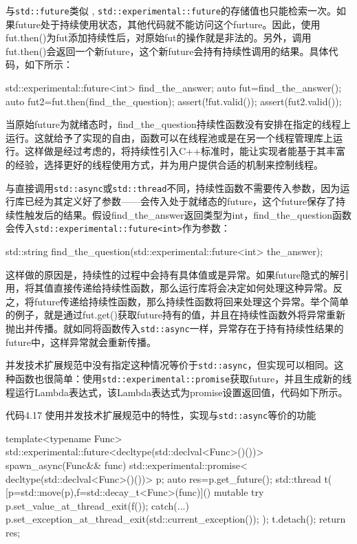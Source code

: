 与\texttt{std::future}类似 ,  \texttt{std::experimental::future}的存储值也只能检索一次。如果future处于持续使用状态，其他代码就不能访问这个furture。因此，使用fut.then()为fut添加持续性后，对原始fut的操作就是非法的。另外，调用fut.then()会返回一个新future，这个新future会持有持续性调用的结果。具体代码，如下所示：

\begin{cpp}
std::experimental::future<int> find_the_answer;
auto fut=find_the_answer();
auto fut2=fut.then(find_the_question);
assert(!fut.valid());
assert(fut2.valid());
\end{cpp}

当原始future为就绪态时，find\_the\_question持续性函数没有安排在指定的线程上运行。这就给予了实现的自由，函数可以在线程池或是在另一个线程管理库上运行。这样做是经过考虑的，将持续性引入C++标准时，能让实现者能基于其丰富的经验，选择更好的线程使用方式，并为用户提供合适的机制来控制线程。

与直接调用\texttt{std::async}或\texttt{std::thread}不同，持续性函数不需要传入参数，因为运行库已经为其定义好了参数——会传入处于就绪态的future，这个future保存了持续性触发后的结果。假设find\_the\_answer返回类型为int，find\_the\_question函数会传入\texttt{std::experimental::future<int>}作为参数：

\begin{cpp}
std::string find_the_question(std::experimental::future<int> the_answer);
\end{cpp}

这样做的原因是，持续性的过程中会持有具体值或是异常。如果future隐式的解引用，将其值直接传递给持续性函数，那么运行库将会决定如何处理这种异常。反之，将future传递给持续性函数，那么持续性函数将回来处理这个异常。举个简单的例子，就是通过fut.get()获取future持有的值，并且在持续性函数外将异常重新抛出并传播。就如同将函数传入\texttt{std::async}一样，异常存在于持有持续性结果的future中，这样异常就会重新传播。

并发技术扩展规范中没有指定这种情况等价于\texttt{std::async}，但实现可以相同。这种函数也很简单：使用\texttt{std::experimental::promise}获取future，并且生成新的线程运行Lambda表达式，该Lambda表达式为promise设置返回值，代码如下所示。

代码4.17 使用并发技术扩展规范中的特性，实现与\texttt{std::async}等价的功能

\begin{cpp}
template<typename Func>
std::experimental::future<decltype(std::declval<Func>()())>
spawn_async(Func&& func){
  std::experimental::promise<
    decltype(std::declval<Func>()())> p;
  auto res=p.get_future();
  std::thread t(
    [p=std::move(p),f=std::decay_t<Func>(func)]()
      mutable{
      try{
        p.set_value_at_thread_exit(f());
      } catch(...){
        p.set_exception_at_thread_exit(std::current_exception());
      }
  });
  t.detach();
  return res;
}
\end{cpp}

